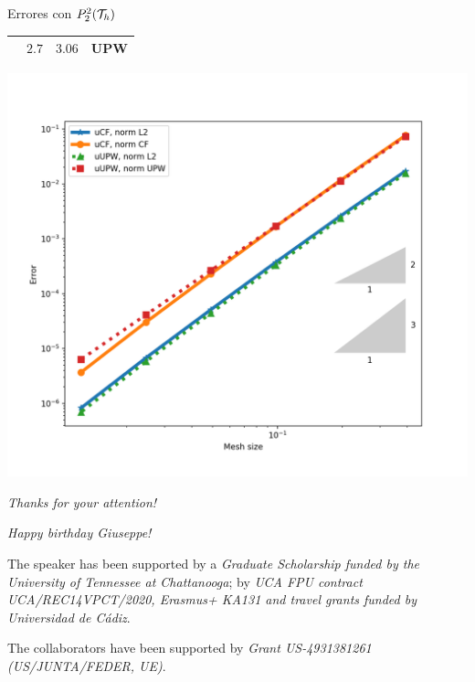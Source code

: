 \begin{frame}{Errores con $\relax{P}_2^2(\mathcal{T}_h)$}
\begin{minipage}{0.49\textwidth}
\begin{tabular}{|c|c|c|c|}
					& $2.7$ & $3.06$& UPW\\
					\hline
				\end{tabular}
		\end{minipage}
		\hspace*{0.35cm}
		\begin{minipage}{0.5\textwidth}
			\centering
			\includegraphics[scale=0.30]{img/Conveccion_Reaccion/errores_conveccion_reaccion_P2dc.png}
		\end{minipage}
		\end{frame}


\begin{frame}{}
	\centering
	\vspace*{1cm}
	{\Huge
		\emph{Thanks for your attention!}}
	
	\vspace*{0.5cm}
	\emph{Happy birthday Giuseppe!}
	
	\vspace*{1cm}
	\begin{acknowledgements}
		The speaker has been supported by a \textit{Graduate Scholarship funded by the University of Tennessee at Chattanooga}; by \textit{UCA FPU contract UCA/REC14VPCT/2020, Erasmus+ KA131 and travel grants funded by Universidad de Cádiz}.
		
		The collaborators have been supported by \textit{Grant US-4931381261 (US/JUNTA/FEDER, UE)}.
	\end{acknowledgements}
\end{frame}